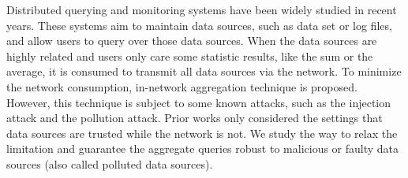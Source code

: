 
	Distributed querying and monitoring systems have been widely studied in recent years. These systems aim to maintain data sources, such as data set or log files, and allow users to query over those data sources. When the data sources are highly related and users only care some statistic results, like the sum or the average, it is consumed to transmit all data sources via the network. To minimize the network consumption, in-network aggregation technique is proposed. However, this technique is subject to some known attacks, such as the injection attack and the pollution attack. Prior works only considered the settings that data sources are trusted while the network is not. We study the way to relax the limitation and guarantee the aggregate queries robust to malicious or faulty data sources (also called polluted data sources). 
